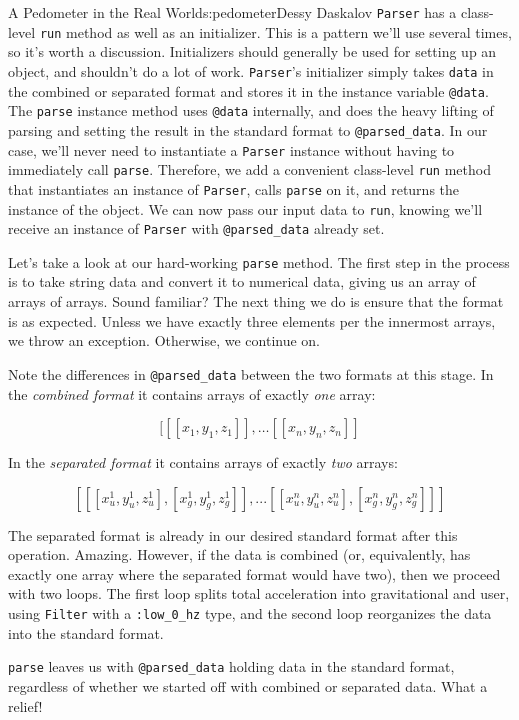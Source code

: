 \begin{aosachapter}{A Pedometer in the Real World}{s:pedometer}{Dessy Daskalov}
\texttt{Parser} has a class-level \texttt{run} method as well as an
initializer. This is a pattern we'll use several times, so it's worth a
discussion. Initializers should generally be used for setting up an
object, and shouldn't do a lot of work. \texttt{Parser}'s initializer
simply takes \texttt{data} in the combined or separated format and
stores it in the instance variable \texttt{@data}. The \texttt{parse}
instance method uses \texttt{@data} internally, and does the heavy
lifting of parsing and setting the result in the standard format to
\texttt{@parsed\_data}. In our case, we'll never need to instantiate a
\texttt{Parser} instance without having to immediately call
\texttt{parse}. Therefore, we add a convenient class-level \texttt{run}
method that instantiates an instance of \texttt{Parser}, calls
\texttt{parse} on it, and returns the instance of the object. We can now
pass our input data to \texttt{run}, knowing we'll receive an instance
of \texttt{Parser} with \texttt{@parsed\_data} already set.

Let's take a look at our hard-working \texttt{parse} method. The first
step in the process is to take string data and convert it to numerical
data, giving us an array of arrays of arrays. Sound familiar? The next
thing we do is ensure that the format is as expected. Unless we have
exactly three elements per the innermost arrays, we throw an exception.
Otherwise, we continue on.

Note the differences in \texttt{@parsed\_data} between the two formats
at this stage. In the \emph{combined format} it contains arrays of
exactly \emph{one} array:

\[
[[[x_1, y_1, z_1]], \ldots [[x_n, y_n, z_n]]
\]

In the \emph{separated format} it contains arrays of exactly \emph{two}
arrays:

\[[[[x_{u}^1,y_{u}^1,z_{u}^1], [x_{g}^1,y_{g}^1,z_{g}^1]], ... [[x_{u}^n,y_{u}^n,z_{u}^n], [x_{g}^n,y_{g}^n,z_{g}^n]]]\]

The separated format is already in our desired standard format after
this operation. Amazing. However, if the data is combined (or,
equivalently, has exactly one array where the separated format would
have two), then we proceed with two loops. The first loop splits total
acceleration into gravitational and user, using \texttt{Filter} with a
\texttt{:low\_0\_hz} type, and the second loop reorganizes the data into
the standard format.

\texttt{parse} leaves us with \texttt{@parsed\_data} holding data in the
standard format, regardless of whether we started off with combined or
separated data. What a relief!


\end{aosachapter}
